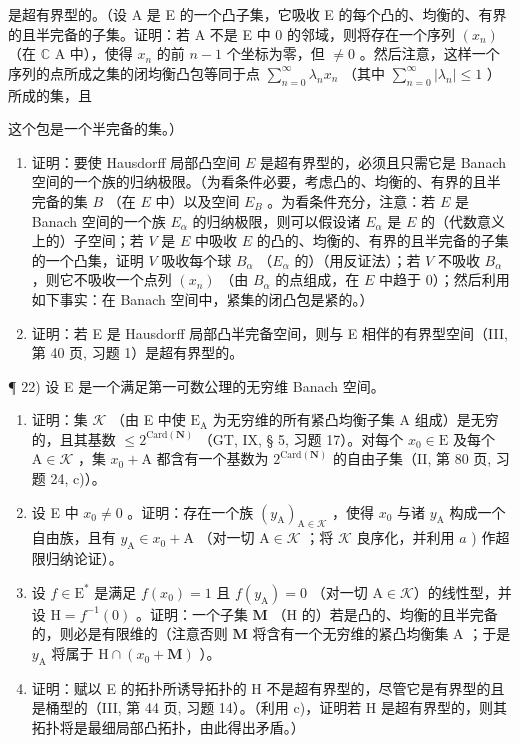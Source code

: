 是超有界型的。（设 A 是 E 的一个凸子集，它吸收 E 的每个凸的、均衡的、有界的且半完备的子集。证明：若 A 不是 E 中 0 的邻域，则将存在一个序列 \((x_{n})\) （在 \(\mathbb{C}\) A 中），使得 \(x_{n}\) 的前 \(n - 1\) 个坐标为零，但 \(\neq 0\) 。然后注意，这样一个序列的点所成之集的闭均衡凸包等同于点 \(\sum_{n = 0}^{\infty}\lambda_n x_n\) （其中 \(\sum_{n = 0}^{\infty}|\lambda_n| \leqslant 1\) ）所成的集，且

这个包是一个半完备的集。）

\begin{enumerate}
\def\labelenumi{\arabic{enumi})}
\setcounter{enumi}{19}
\item
  证明：要使 Hausdorff 局部凸空间 \(E\) 是超有界型的，必须且只需它是 Banach 空间的一个族的归纳极限。（为看条件必要，考虑凸的、均衡的、有界的且半完备的集 \(B\) （在 \(E\) 中）以及空间 \(E_B\) 。为看条件充分，注意：若 \(E\) 是 Banach 空间的一个族 \(E_\alpha\) 的归纳极限，则可以假设诸 \(E_\alpha\) 是 \(E\) 的（代数意义上的）子空间；若 \(V\) 是 \(E\) 中吸收 \(E\) 的凸的、均衡的、有界的且半完备的子集的一个凸集，证明 \(V\) 吸收每个球 \(B_\alpha\) （\(E_\alpha\) 的）（用反证法）；若 \(V\) 不吸收 \(B_\alpha\) ，则它不吸收一个点列 \((x_n)\) （由 \(B_\alpha\) 的点组成，在 \(E\) 中趋于 0）；然后利用如下事实：在 Banach 空间中，紧集的闭凸包是紧的。）
\item
  证明：若 E 是 Hausdorff 局部凸半完备空间，则与 E 相伴的有界型空间（III, 第 40 页, 习题 1）是超有界型的。
\end{enumerate}

¶ 22) 设 E 是一个满足第一可数公理的无穷维 Banach 空间。

\begin{enumerate}
\def\labelenumi{\alph{enumi})}
\item
  证明：集 \(\mathcal{K}\) （由 E 中使 \(\mathrm{E_A}\) 为无穷维的所有紧凸均衡子集 A 组成）是无穷的，且其基数 \(\leqslant 2^{\mathrm{Card}(\mathbf{N})}\) （GT, IX, § 5, 习题 17）。对每个 \(x_0 \in \mathrm{E}\) 及每个 \(\mathrm{A} \in \mathcal{K}\) ，集 \(x_0 + \mathrm{A}\) 都含有一个基数为 \(2^{\mathrm{Card}(\mathbf{N})}\) 的自由子集（II, 第 80 页, 习题 24, c)）。
\item
  设 E 中 \(x_0 \neq 0\) 。证明：存在一个族 \((y_{\mathrm{A}})_{\mathrm{A} \in \mathcal{K}}\) ，使得 \(x_0\) 与诸 \(y_{\mathrm{A}}\) 构成一个自由族，且有 \(y_{\mathrm{A}} \in x_0 + \mathrm{A}\) （对一切 \(\mathrm{A} \in \mathcal{K}\) ；将 \(\mathcal{K}\) 良序化，并利用 \(a\) ) 作超限归纳论证）。
\item
  设 \(f \in \mathrm{E}^{*}\) 是满足 \(f(x_0) = 1\) 且 \(f(y_{\mathrm{A}}) = 0\) （对一切 \(\mathrm{A} \in \mathcal{K}\)）的线性型，并设 \(\mathrm{H} = f^{-1}(0)\) 。证明：一个子集 \(\mathbf{M}\) （\(\mathrm{H}\) 的）若是凸的、均衡的且半完备的，则必是有限维的（注意否则 \(\mathbf{M}\) 将含有一个无穷维的紧凸均衡集 \(\mathrm{A}\) ；于是 \(y_{\mathrm{A}}\) 将属于 \(\mathrm{H} \cap (x_0 + \mathbf{M})\) ）。
\item
  证明：赋以 E 的拓扑所诱导拓扑的 H 不是超有界型的，尽管它是有界型的且是桶型的（III, 第 44 页, 习题 14）。（利用 c)，证明若 H 是超有界型的，则其拓扑将是最细局部凸拓扑，由此得出矛盾。）
\end{enumerate}

